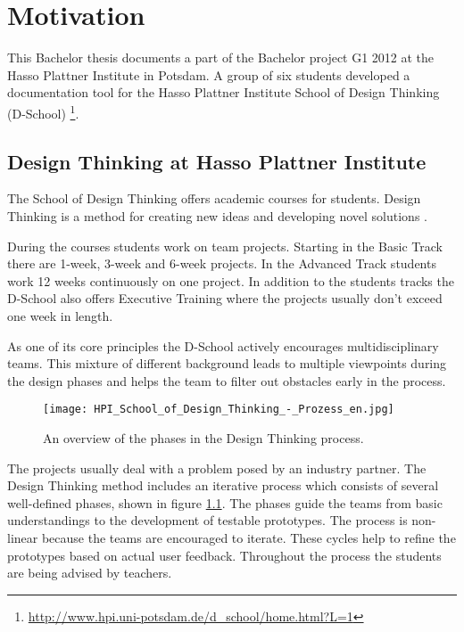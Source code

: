 \chapter{Motivation}

This Bachelor thesis documents a part of the Bachelor project G1 2012 at the Hasso Plattner Institute in Potsdam. A group of six students developed a documentation tool for the Hasso Plattner Institute School of Design Thinking (D-School) \footnote{\url{http://www.hpi.uni-potsdam.de/d_school/home.html?L=1}}. 

\section{Design Thinking at Hasso Plattner Institute}
The School of Design Thinking offers academic courses for students. Design Thinking is a method for creating new ideas and developing novel solutions \cite{Plattner_2009}. 

During the courses students work on team projects. Starting in the Basic Track there are 1-week, 3-week and 6-week projects. In the Advanced Track students work 12 weeks continuously on one project. In addition to the students tracks the D-School also offers Executive Training where the projects usually don't exceed one week in length. 

As one of its core principles the D-School actively encourages multidisciplinary teams. This mixture of different background leads to multiple viewpoints during the design phases and helps the team to filter out obstacles early in the process. 

\begin{figure}
\texttt{[image: HPI\_School\_of\_Design\_Thinking\_-\_Prozess\_en.jpg]}
\caption[An overview of the phases in the Design Thinking process. Source: \url{http://www.hpi.uni-potsdam.de/presse/fotos/school_of_design_thinking.html}]{An overview of the phases in the Design Thinking process.}
\label{fig:DT_phases}
\end{figure}

The projects usually deal with a problem posed by an industry partner. The Design Thinking method includes an iterative process which consists of several well-defined phases, shown in figure \ref{fig:DT_phases}. The phases guide the teams from basic understandings to the development of testable prototypes. The process is non-linear because the teams are encouraged to iterate. These cycles help to refine the prototypes based on actual user feedback. Throughout the process the students are being advised by teachers.

